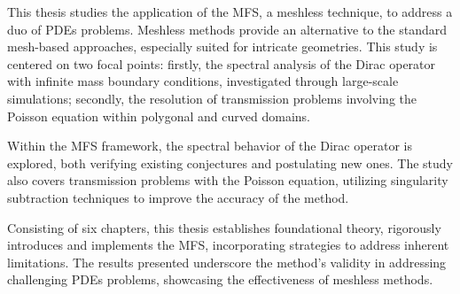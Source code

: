 \acresetall
\noindent
This thesis studies the application of the \ac{MFS}, a meshless technique, to address a duo of \acp{PDE} problems. Meshless methods provide an alternative to the standard mesh-based approaches, especially suited for intricate geometries. This study is centered on two focal points: firstly, the spectral analysis of the Dirac operator with infinite mass boundary conditions, investigated through large-scale simulations; secondly, the resolution of transmission problems involving the Poisson equation within polygonal and curved domains.

Within the \ac{MFS} framework, the spectral behavior of the Dirac operator is explored, both verifying existing conjectures and postulating new ones. The study also covers transmission problems with the Poisson equation, utilizing singularity subtraction techniques to improve the accuracy of the method.

Consisting of six chapters, this thesis establishes foundational theory, rigorously introduces and implements the \ac{MFS}, incorporating strategies to address inherent limitations. The results presented underscore the method's validity in addressing challenging \acp{PDE} problems, showcasing the effectiveness of meshless methods.